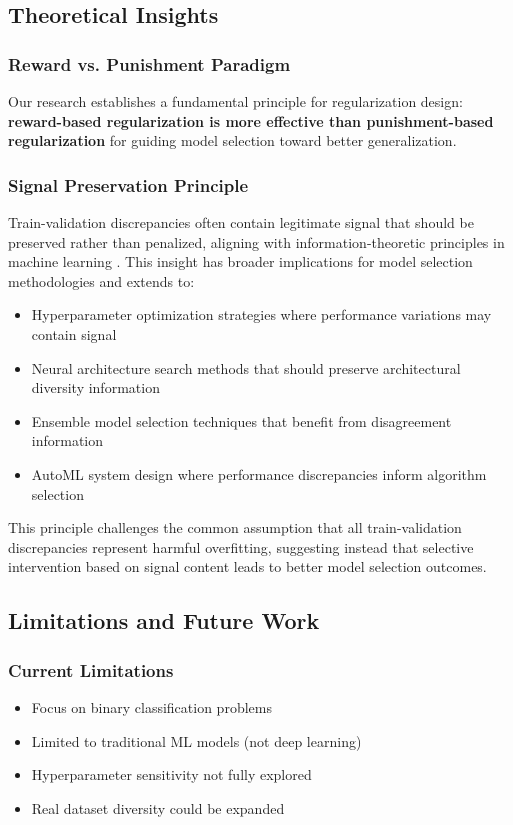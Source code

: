 \documentclass[twoside,11pt]{article}
\begin{document}
\subsection{Theoretical Insights}

\subsubsection{Reward vs. Punishment Paradigm}
Our research establishes a fundamental principle for regularization design: \textbf{reward-based regularization is more effective than punishment-based regularization} for guiding model selection toward better generalization.

\subsubsection{Signal Preservation Principle}
Train-validation discrepancies often contain legitimate signal that should be preserved rather than penalized, aligning with information-theoretic principles in machine learning \citep{hastie2009elements}. This insight has broader implications for model selection methodologies \citep{arlot2010survey} and extends to:
\begin{itemize}
    \item Hyperparameter optimization strategies where performance variations may contain signal
    \item Neural architecture search methods that should preserve architectural diversity information
    \item Ensemble model selection techniques that benefit from disagreement information \citep{breiman2001random}
    \item AutoML system design where performance discrepancies inform algorithm selection
\end{itemize}

This principle challenges the common assumption that all train-validation discrepancies represent harmful overfitting, suggesting instead that selective intervention based on signal content leads to better model selection outcomes.

\subsection{Limitations and Future Work}

\subsubsection{Current Limitations}
\begin{itemize}
    \item Focus on binary classification problems
    \item Limited to traditional ML models (not deep learning)
    \item Hyperparameter sensitivity not fully explored
    \item Real dataset diversity could be expanded
\end{itemize}
\end{document}
